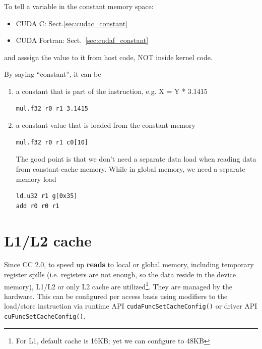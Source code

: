 To tell a variable in the constant memory space:
\begin{itemize}
  \item CUDA C:  Sect.\ref{sec:cudac_constant}
  
  \item CUDA Fortran: Sect.~\ref{sec:cudaf_constant}
\end{itemize}
and asssign the value to it from host code, NOT inside kernel code.

\begin{mdframed}

By saying ``constant'', it can be
\begin{enumerate}

  \item a constant that is part of the instruction, e.g. X = Y * 3.1415
\begin{verbatim}
mul.f32 r0 r1 3.1415
\end{verbatim}


  \item a constant value that is loaded from the constant memory
\begin{verbatim}
mul.f32 r0 r1 c0[10]
\end{verbatim}
  The good point is that we don't need a separate data load when reading
  data from constant-cache memory. While in global memory, we need a
  separate memory load
\begin{verbatim}
ld.u32 r1 g[0x35]
add r0 r0 r1 
\end{verbatim}
\end{enumerate}
\end{mdframed}



\section{L1/L2 cache}
\label{sec:L1/L2-cache}

Since CC 2.0, to speed up {\bf reads} to local or global memory,
including temporary register spills (i.e.  registers are not enough,
so the data reside in the device memory), L1/L2 or only L2 cache are
utilized\footnote{For L1, default cache is 16KB; yet we can configure
  to 48KB}.
They are managed by the hardware.  This can be configured per access
basis using modifiers to the load/store instruction via runtime API
\verb!cudaFuncSetCacheConfig()!  or driver API
\verb!cuFuncSetCacheConfig()!.

